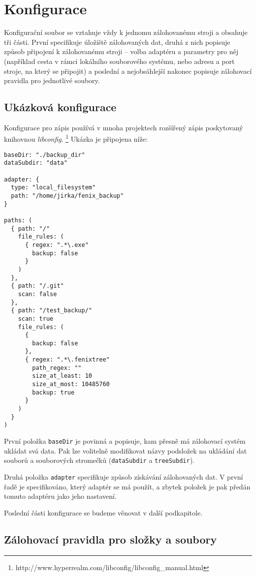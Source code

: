 \section{Konfigurace}

Konfigurační soubor se vztahuje vždy k jednomu zálohovanému stroji a obsahuje
tři části. První specifikuje úložiště zálohovaných dat, druhá z nich popisuje
způsob připojení k zálohovanému stroji -- volba adaptéru a parametry pro něj
(například cesta v rámci lokálního souborového systému, nebo adresu a port
stroje, na který se připojit) a poslední a nejobsáhlejší nakonec popisuje
zálohovací pravidla pro jednotlivé soubory.

\subsection*{Ukázková konfigurace}

Konfigurace pro zápis používá v mnoha projektech rozšířený zápis poskytovaný
knihovnou {\it libconfig}.%
\footnote{http://www.hyperrealm.com/libconfig/libconfig\_manual.html}
Ukázka je připojena níže:

\begin{verbatim}
baseDir: "./backup_dir"
dataSubdir: "data"

adapter: {
  type: "local_filesystem"
  path: "/home/jirka/fenix_backup"
}

paths: (
  { path: "/"
    file_rules: (
      { regex: ".*\.exe"
        backup: false
      }
    )
  },
  { path: "/.git"
    scan: false
  },
  { path: "/test_backup/"
    scan: true
    file_rules: (
      {
        backup: false
      },
      { regex: ".*\.fenixtree"
        path_regex: ""
        size_at_least: 10
        size_at_most: 10485760
        backup: true
      }
    )
  }
)
\end{verbatim}

První položka \texttt{baseDir} je povinná a popisuje, kam přesně má zálohovací
systém ukládat svá data. Pak lze volitelně modifikovat názvy podsložek na
ukládání dat souborů a souborových stromečků (\texttt{dataSubdir}
a \texttt{treeSubdir}).

Druhá položka \texttt{adapter} specifikuje způsob získávání zálohovaných dat.
V první řadě je specifikováno, který adaptér se má použít, a zbytek položek je
pak předán tomuto adaptéru jako jeho nastavení.

Poslední části konfigurace se budeme věnovat v další podkapitole.

\subsection{Zálohovací pravidla pro složky a soubory}

